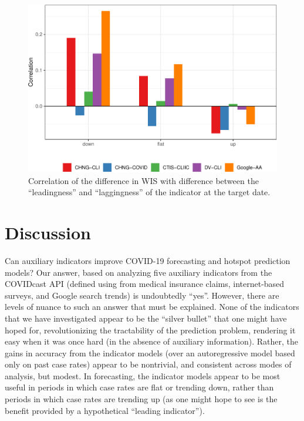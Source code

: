 \documentclass[9pt,twocolumn,twoside,lineno]{pnas-new}
\begin{document}
\begin{figure}[t]
  \includegraphics[width=\columnwidth]{fig/diff-in-lead-lag-1.pdf}
  \caption{Correlation of the difference in WIS with difference between the
    ``leadingness'' and ``laggingness'' of the indicator at the target date.}
  \label{fig:diff-btw-leading-lagging}
\end{figure}




\section{Discussion}

Can auxiliary indicators improve COVID-19 forecasting and hotspot prediction
models?  Our answer, based on analyzing five auxiliary indicators from the  
COVIDcast API (defined using from medical insurance claims, internet-based
surveys, and Google search trends) is undoubtedly ``yes''. However, there are 
levels of nuance to such an answer that must be explained.  None of the
indicators that we have investigated appear to be the ``silver bullet'' that 
one might have hoped for, revolutionizing the tractability of the prediction 
problem, rendering it easy when it was once hard (in the absence of auxiliary 
information).  Rather, the gains in accuracy from the indicator models (over an
autoregressive model based only on past case rates) appear to be nontrivial, and
consistent across modes of analysis, but modest.  In forecasting, the indicator 
models appear to be most useful in periods in which case rates are flat or
trending down, rather than periods in which case rates are trending up (as one 
might hope to see is the benefit provided by a hypothetical ``leading
indicator'').    
\end{document}
